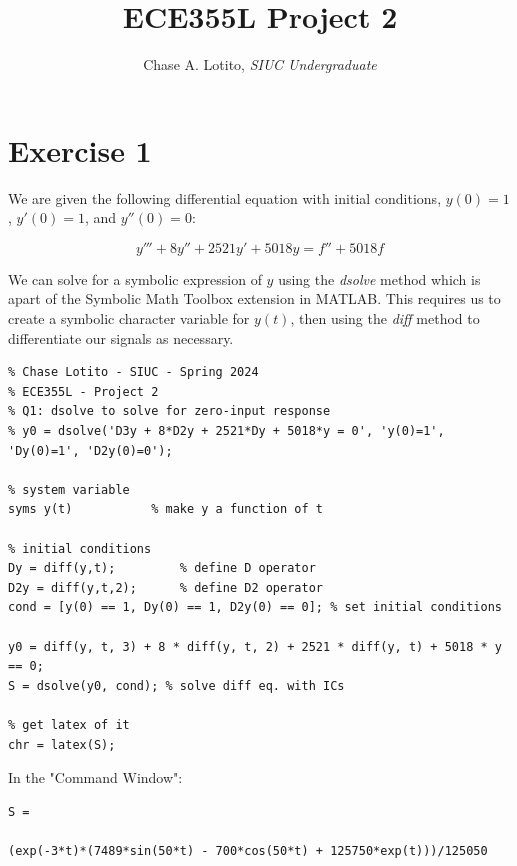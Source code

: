 \documentclass{article}
\title{\vspace{-3cm}ECE355L Project 2}
\author{Chase A. Lotito, \textit{SIUC Undergraduate}}
\date{}
\begin{document}
\pagestyle{fancy}

\fancyhead{}

\maketitle %

\section{Exercise 1}

We are given the following differential equation with initial conditions, \(y(0)=1\), \(y'(0) = 1\), and \(y''(0)=0\):

\begin{equation} 
    y''' + 8y'' + 2521y' + 5018y = f'' + 5018f
\end{equation}

We can solve for a symbolic expression of \(y\) using the \textit{dsolve} method which is apart of the Symbolic Math Toolbox extension in MATLAB. This requires us to create a symbolic character variable for \(y(t)\), then using the \textit{diff} method to differentiate our signals as necessary.

\begin{lstlisting}
% Chase Lotito - SIUC - Spring 2024
% ECE355L - Project 2
% Q1: dsolve to solve for zero-input response
% y0 = dsolve('D3y + 8*D2y + 2521*Dy + 5018*y = 0', 'y(0)=1', 'Dy(0)=1', 'D2y(0)=0');

% system variable
syms y(t)           % make y a function of t

% initial conditions
Dy = diff(y,t);         % define D operator
D2y = diff(y,t,2);      % define D2 operator
cond = [y(0) == 1, Dy(0) == 1, D2y(0) == 0]; % set initial conditions

y0 = diff(y, t, 3) + 8 * diff(y, t, 2) + 2521 * diff(y, t) + 5018 * y == 0;
S = dsolve(y0, cond); % solve diff eq. with ICs

% get latex of it
chr = latex(S);
\end{lstlisting}

In the "Command Window":

\begin{lstlisting}
S =
 
(exp(-3*t)*(7489*sin(50*t) - 700*cos(50*t) + 125750*exp(t)))/125050
\end{lstlisting}
\end{document}
